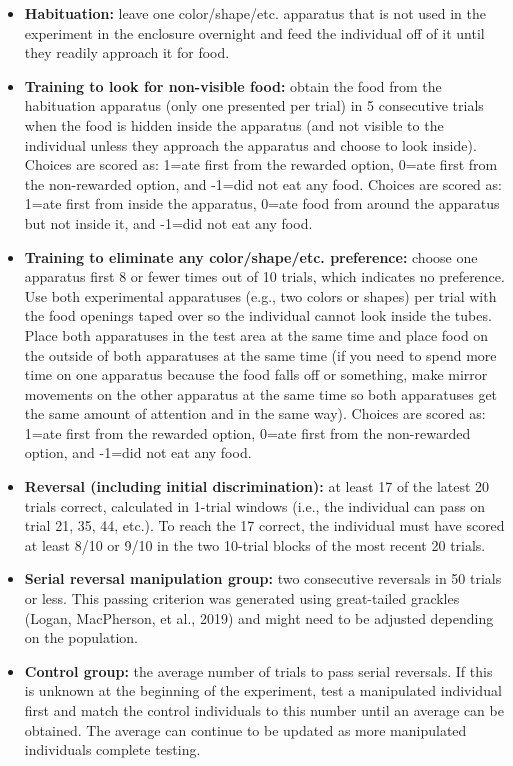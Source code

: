 \documentclass[
]{article}
\providecommand{\tightlist}{%
  \setlength{\itemsep}{0pt}\setlength{\parskip}{0pt}}
\begin{document}
\begin{itemize}
\tightlist
\item
  \textbf{Habituation:} leave one color/shape/etc. apparatus that is not
  used in the experiment in the enclosure overnight and feed the
  individual off of it until they readily approach it for food.
\item
  \textbf{Training to look for non-visible food:} obtain the food from
  the habituation apparatus (only one presented per trial) in 5
  consecutive trials when the food is hidden inside the apparatus (and
  not visible to the individual unless they approach the apparatus and
  choose to look inside). Choices are scored as: 1=ate first from the
  rewarded option, 0=ate first from the non-rewarded option, and -1=did
  not eat any food. Choices are scored as: 1=ate first from inside the
  apparatus, 0=ate food from around the apparatus but not inside it, and
  -1=did not eat any food.
\item
  \textbf{Training to eliminate any color/shape/etc. preference:} choose
  one apparatus first 8 or fewer times out of 10 trials, which indicates
  no preference. Use both experimental apparatuses (e.g., two colors or
  shapes) per trial with the food openings taped over so the individual
  cannot look inside the tubes. Place both apparatuses in the test area
  at the same time and place food on the outside of both apparatuses at
  the same time (if you need to spend more time on one apparatus because
  the food falls off or something, make mirror movements on the other
  apparatus at the same time so both apparatuses get the same amount of
  attention and in the same way). Choices are scored as: 1=ate first
  from the rewarded option, 0=ate first from the non-rewarded option,
  and -1=did not eat any food.
\item
  \textbf{Reversal (including initial discrimination):} at least 17 of
  the latest 20 trials correct, calculated in 1-trial windows (i.e., the
  individual can pass on trial 21, 35, 44, etc.). To reach the 17
  correct, the individual must have scored at least 8/10 or 9/10 in the
  two 10-trial blocks of the most recent 20 trials.
\item
  \textbf{Serial reversal manipulation group:} two consecutive reversals
  in 50 trials or less. This passing criterion was generated using
  great-tailed grackles (Logan, MacPherson, et al., 2019) and might need
  to be adjusted depending on the population.
\item
  \textbf{Control group:} the average number of trials to pass serial
  reversals. If this is unknown at the beginning of the experiment, test
  a manipulated individual first and match the control individuals to
  this number until an average can be obtained. The average can continue
  to be updated as more manipulated individuals complete testing.
\end{itemize}
\end{document}
